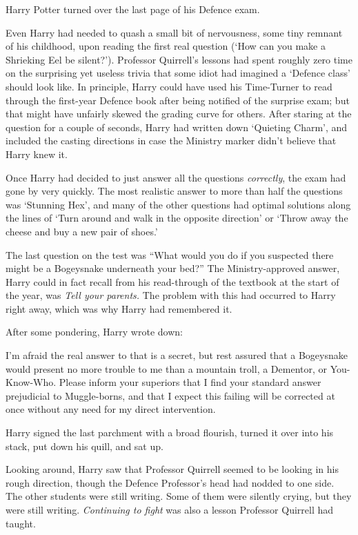 \later

Harry Potter turned over the last page of his Defence exam.

Even Harry had needed to quash a small bit of nervousness, some tiny remnant of his childhood, upon reading the first real question (‘How can you make a Shrieking Eel be silent?’). Professor Quirrell’s lessons had spent roughly zero time on the surprising yet useless trivia that some idiot had imagined a ‘Defence class’ should look like. In principle, Harry could have used his Time-Turner to read through the first-year Defence book after being notified of the surprise exam; but that might have unfairly skewed the grading curve for others. After staring at the question for a couple of seconds, Harry had written down ‘Quieting Charm’, and included the casting directions in case the Ministry marker didn’t believe that Harry knew it.

Once Harry had decided to just answer all the questions \emph{correctly}, the exam had gone by very quickly. The most realistic answer to more than half the questions was ‘Stunning Hex’, and many of the other questions had optimal solutions along the lines of ‘Turn around and walk in the opposite direction’ or ‘Throw away the cheese and buy a new pair of shoes.’

The last question on the test was
“What would you do if you suspected there might be a Bogeysnake underneath your bed?” The Ministry-approved answer, Harry could in fact recall from his read-through of the textbook at the start of the year, was \emph{Tell your parents.} The problem with this had occurred to Harry right away, which was why Harry had remembered it.

After some pondering, Harry wrote down:

\begin{writtenNote}
I’m afraid the real answer to that is a secret, but rest assured that a Bogeysnake would present no more trouble to me than a mountain troll, a Dementor, or You-Know-Who. Please inform your superiors that I find your standard answer prejudicial to Muggle-borns, and that I expect this failing will be corrected at once without any need for my direct intervention.
\end{writtenNote}

Harry signed the last parchment with a broad flourish, turned it over into his stack, put down his quill, and sat up.

Looking around, Harry saw that Professor Quirrell seemed to be looking in his rough direction, though the Defence Professor’s head had nodded to one side. The other students were still writing. Some of them were silently crying, but they were still writing. \emph{Continuing to fight} was also a lesson Professor Quirrell had taught.

